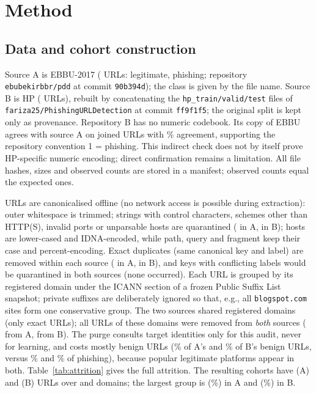 \section{Method}
\subsection{Data and cohort construction}
Source A is EBBU-2017 ( URLs:  legitimate,  phishing; repository \texttt{ebubekirbbr/pdd} at commit \texttt{90b394d}); the class is given by the file name. Source B is HP ( URLs), rebuilt by concatenating the \texttt{hp\_train/valid/test} files of \texttt{fariza25/PhishingURLDetection} at commit \texttt{ff9f1f5}; the original split is kept only as provenance. Repository B has no numeric codebook. Its copy of EBBU agrees with source A on  joined URLs with \% agreement, supporting the repository convention 1 = phishing. This indirect check does not by itself prove HP-specific numeric encoding; direct confirmation remains a limitation. All file hashes, sizes and observed counts are stored in a manifest; observed counts equal the expected ones.

URLs are canonicalised offline (no network access is possible during extraction): outer whitespace is trimmed; strings with control characters, schemes other than HTTP(S), invalid ports or unparsable hosts are quarantined ( in A,  in B); hosts are lower-cased and IDNA-encoded, while path, query and fragment keep their case and percent-encoding. Exact duplicates (same canonical key and label) are removed within each source ( in A,  in B), and keys with conflicting labels would be quarantined in both sources (none occurred). Each URL is grouped by its registered domain under the ICANN section of a frozen Public Suffix List snapshot; private suffixes are deliberately ignored so that, e.g., all \texttt{blogspot.com} sites form one conservative group. The two sources shared  registered domains (only  exact URLs); all URLs of these domains were removed from \emph{both} sources ( from A,  from B). The purge consults target identities only for this audit, never for learning, and costs mostly benign URLs (\% of A's and \% of B's benign URLs, versus \% and \% of phishing), because popular legitimate platforms appear in both. Table~\ref{tab:attrition} gives the full attrition. The resulting cohorts have  (A) and  (B) URLs over  and  domains; the largest group is \texttt{} (\%) in A and \texttt{} (\%) in B.

